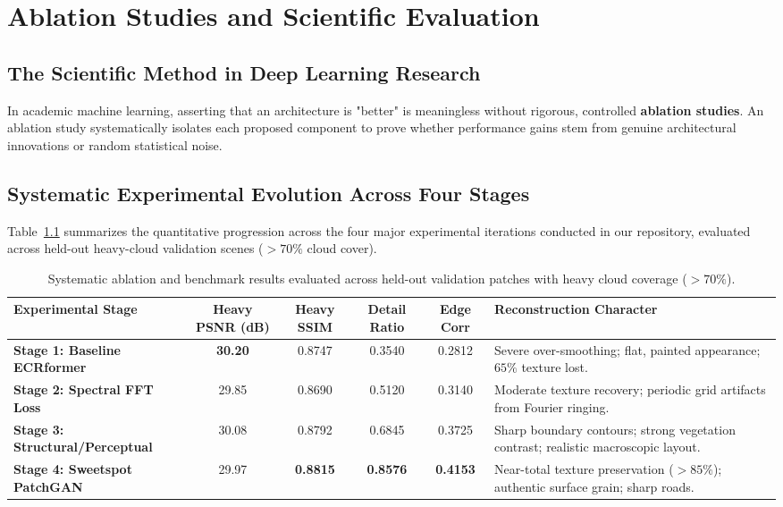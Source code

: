 \chapter{Ablation Studies and Scientific Evaluation}
\label{chap:ch21}

\section{The Scientific Method in Deep Learning Research}
In academic machine learning, asserting that an architecture is "better" is meaningless without rigorous, controlled \textbf{ablation studies}. An ablation study systematically isolates each proposed component to prove whether performance gains stem from genuine architectural innovations or random statistical noise.

\section{Systematic Experimental Evolution Across Four Stages}
Table~\ref{tab:ablation_results} summarizes the quantitative progression across the four major experimental iterations conducted in our repository, evaluated across held-out heavy-cloud validation scenes ($>70\%$ cloud cover).

\begin{table}[htbp]
\centering
\small
\begin{tabularx}{\textwidth}{lccccX}
\toprule
\textbf{Experimental Stage} & \textbf{Heavy PSNR (dB)} & \textbf{Heavy SSIM} & \textbf{Detail Ratio} & \textbf{Edge Corr} & \textbf{Reconstruction Character} \\
\midrule
\textbf{Stage 1: Baseline ECRformer} & \textbf{30.20} & 0.8747 & 0.3540 & 0.2812 & Severe over-smoothing; flat, painted appearance; $65\%$ texture lost. \\
\textbf{Stage 2: Spectral FFT Loss} & 29.85 & 0.8690 & 0.5120 & 0.3140 & Moderate texture recovery; periodic grid artifacts from Fourier ringing. \\
\textbf{Stage 3: Structural/Perceptual} & 30.08 & 0.8792 & 0.6845 & 0.3725 & Sharp boundary contours; strong vegetation contrast; realistic macroscopic layout. \\
\textbf{Stage 4: Sweetspot PatchGAN} & 29.97 & \textbf{0.8815} & \textbf{0.8576} & \textbf{0.4153} & Near-total texture preservation ($>85\%$); authentic surface grain; sharp roads. \\
\bottomrule
\end{tabularx}
\caption{Systematic ablation and benchmark results evaluated across held-out validation patches with heavy cloud coverage ($>70\%$).}
\label{tab:ablation_results}
\end{table}

